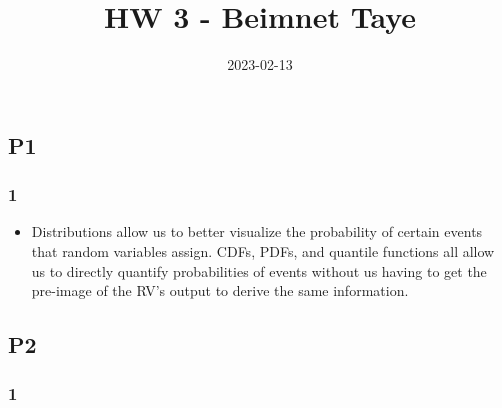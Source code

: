 \documentclass[
]{article}
\title{HW 3 - Beimnet Taye}
\author{}
\date{\vspace{-2.5em}2023-02-13}
\providecommand{\tightlist}{%
  \setlength{\itemsep}{0pt}\setlength{\parskip}{0pt}}
\begin{document}
\maketitle

\hypertarget{p1}{%
\subsection{P1}\label{p1}}

\hypertarget{section}{%
\subsubsection{1}\label{section}}

\begin{itemize}
\tightlist
\item
  Distributions allow us to better visualize the probability of certain
  events that random variables assign. CDFs, PDFs, and quantile
  functions all allow us to directly quantify probabilities of events
  without us having to get the pre-image of the RV's output to derive
  the same information.
\end{itemize}

\hypertarget{p2}{%
\subsection{P2}\label{p2}}

\hypertarget{section-1}{%
\subsubsection{1}\label{section-1}}
\end{document}
